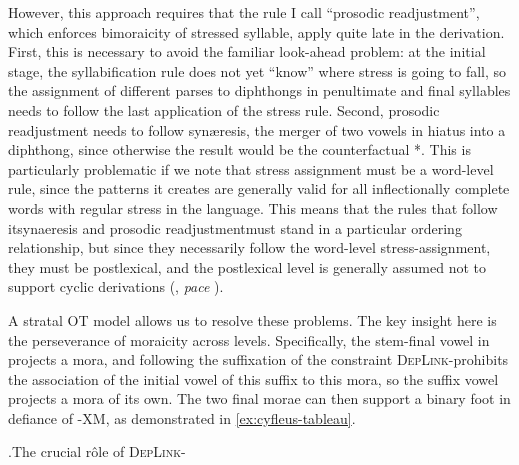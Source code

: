 However, this approach requires that the rule I call \enquote{prosodic readjustment}, which enforces bimoraicity of stressed syllable, apply quite late in the derivation. First, this is necessary to avoid the familiar look-ahead problem: at the initial stage, the syllabification rule does not yet \enquote{know} where stress is going to fall, so the assignment of different parses to diphthongs in penultimate and final syllables needs to follow the last application of the stress rule. Second, prosodic readjustment needs to follow synæresis, \ie the merger of two vowels in hiatus into a diphthong, since otherwise the result would be the counterfactual *\ipa{[kəvˈleːis]}. This is particularly problematic if we note that stress assignment must be a word-level rule, since the patterns it creates are generally valid for all inflectionally complete words with regular stress in the language. This means that the rules that follow it\dash synaeresis and prosodic readjustment\dash must stand in a particular ordering relationship, but since they necessarily follow the word-level stress-assignment, they must be postlexical, and the postlexical level is generally assumed not to support cyclic derivations (\citealt{bermudez-oterong,scheer10:_guide_morph}, \emph{pace} \citealt{mchugh90:_kirun_chaga}).

A stratal OT model allows us to resolve these problems. The key insight here is the perseverance of moraicity across levels. Specifically, the stem-final vowel in \ipa{[ˈkəvle]} projects a mora, and following the suffixation of  the constraint \textsc{DepLink}-\mo[V] prohibits the association of the initial vowel of this suffix to this mora, so the suffix vowel projects a mora of its own. The two final morae can then support a binary foot in defiance of \sy-\textsc{XM}, as demonstrated in \ref{ex:cyfleus-tableau}.

\ex.\label{ex:cyfleus-tableau}The crucial rôle of \textsc{DepLink}-\mo[V]\\

